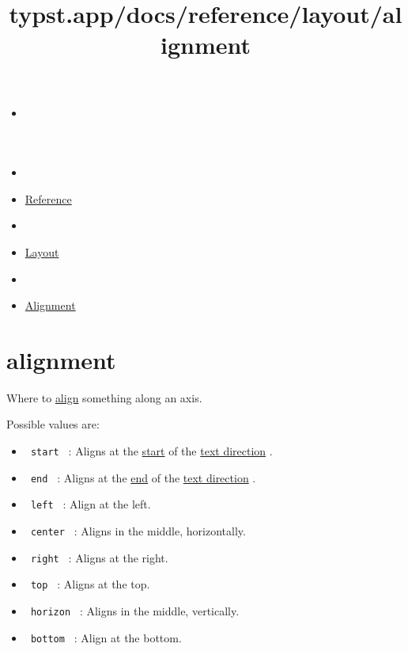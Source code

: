 \title{typst.app/docs/reference/layout/alignment}

\begin{itemize}
\tightlist
\item
  \href{/docs}{}
\item
  
\item
  \href{/docs/reference/}{Reference}
\item
  
\item
  \href{/docs/reference/layout/}{Layout}
\item
  
\item
  \href{/docs/reference/layout/alignment/}{Alignment}
\end{itemize}

\section{\texorpdfstring{{ alignment }}{ alignment }}\label{summary}

Where to \href{/docs/reference/layout/align/}{align} something along an
axis.

Possible values are:

\begin{itemize}
\tightlist
\item
  \texttt{\ start\ } : Aligns at the
  \href{/docs/reference/layout/direction/\#definitions-start}{start} of
  the \href{/docs/reference/text/text/\#parameters-dir}{text direction}
  .
\item
  \texttt{\ end\ } : Aligns at the
  \href{/docs/reference/layout/direction/\#definitions-end}{end} of the
  \href{/docs/reference/text/text/\#parameters-dir}{text direction} .
\item
  \texttt{\ left\ } : Align at the left.
\item
  \texttt{\ center\ } : Aligns in the middle, horizontally.
\item
  \texttt{\ right\ } : Aligns at the right.
\item
  \texttt{\ top\ } : Aligns at the top.
\item
  \texttt{\ horizon\ } : Aligns in the middle, vertically.
\item
  \texttt{\ bottom\ } : Align at the bottom.
\end{itemize}

